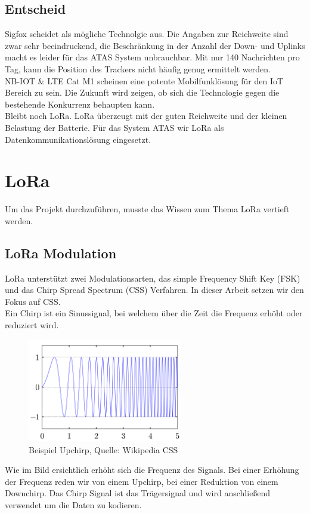 \documentclass[11pt,english,german]{report}
\theoremstyle{definition}
\begin{document}
\subsection{Entscheid}
Sigfox scheidet als mögliche Technolgie aus. Die Angaben zur Reichweite sind zwar sehr beeindruckend, die Beschränkung in der Anzahl der Down- und Uplinks macht es leider für das ATAS System unbrauchbar. Mit nur 140 Nachrichten pro Tag, kann die Position des Trackers nicht häufig genug ermittelt werden.\\[0.3cm]
NB-IOT \& LTE Cat M1 scheinen eine potente Mobilfunklösung für den IoT Bereich zu sein. Die Zukunft wird zeigen, ob sich die Technologie gegen die bestehende Konkurrenz behaupten kann.\\[0.3cm]
Bleibt noch LoRa. LoRa überzeugt mit der guten Reichweite und der kleinen Belastung der Batterie. Für das System ATAS wir LoRa als Datenkommunikationslösung eingesetzt.

\newpage
\section{LoRa}
Um das Projekt durchzuführen, musste das Wissen zum Thema LoRa vertieft werden.

\subsection{LoRa Modulation}
LoRa unterstützt zwei Modulationsarten, das simple Frequency Shift Key (FSK) und das Chirp Spread Spectrum (CSS) Verfahren. In dieser Arbeit setzen wir den Fokus auf CSS.\\[0.3cm]
Ein Chirp ist ein Sinussignal, bei welchem über die Zeit die Frequenz erhöht oder reduziert wird.
\begin{figure}[H]
	\centering
	\includegraphics[width=0.6\textwidth]{img/lora/upchirp.png}
	\caption[Beispiel Upchirp]
	{Beispiel Upchirp, Quelle: Wikipedia CSS \cite{CSS}}
\end{figure}
\noindent
Wie im Bild ersichtlich erhöht sich die Frequenz des Signals. Bei einer Erhöhung der Frequenz reden wir von einem Upchirp, bei einer Reduktion von einem Downchirp. Das Chirp Signal ist das Trägersignal und wird anschließend verwendet um die Daten zu kodieren.
\end{document}
